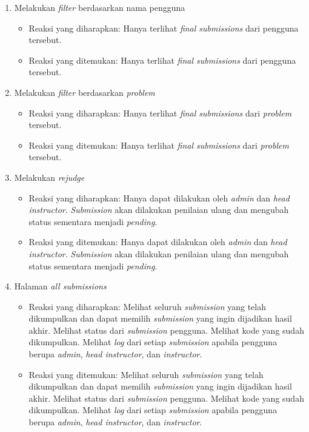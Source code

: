 \begin{enumerate}
\begin{itemize}
	 \end{itemize}
	 \item Melakukan \textit{filter} berdasarkan nama pengguna
	 \begin{itemize}
	 	\item Reaksi yang diharapkan: Hanya terlihat \textit{final submissions} dari pengguna tersebut.
	 	\item Reaksi yang ditemukan: Hanya terlihat \textit{final submissions} dari pengguna tersebut.
	 \end{itemize}
	 \item Melakukan \textit{filter} berdasarkan \textit{problem}
	 \begin{itemize}
	 	\item Reaksi yang diharapkan: Hanya terlihat \textit{final submissions} dari \textit{problem} tersebut.
	 	\item Reaksi yang ditemukan: Hanya terlihat \textit{final submissions} dari \textit{problem} tersebut.
	 \end{itemize}
	 \item Melakukan \textit{rejudge}
	 \begin{itemize}
	 	\item Reaksi yang diharapkan: Hanya dapat dilakukan oleh \textit{admin} dan \textit{head instructor}. \textit{Submission} akan dilakukan penilaian ulang dan mengubah status sementara menjadi \textit{pending}.
	 	\item Reaksi yang ditemukan: Hanya dapat dilakukan oleh \textit{admin} dan \textit{head instructor}. \textit{Submission} akan dilakukan penilaian ulang dan mengubah status sementara menjadi \textit{pending}.
	 \end{itemize}
	 \item Halaman \textit{all submissions}
	 \begin{itemize}
	 	\item Reaksi yang diharapkan: Melihat seluruh \textit{submission} yang telah dikumpulkan dan dapat memilih \textit{submission} yang ingin dijadikan hasil akhir. Melihat status dari \textit{submission} pengguna. Melihat kode yang sudah dikumpulkan. Melihat \textit{log} dari setiap \textit{submission} apabila pengguna berupa \textit{admin}, \textit{head instructor}, dan \textit{instructor}.
	 	\item Reaksi yang ditemukan: Melihat seluruh \textit{submission} yang telah dikumpulkan dan dapat memilih \textit{submission} yang ingin dijadikan hasil akhir. Melihat status dari \textit{submission} pengguna. Melihat kode yang sudah dikumpulkan. Melihat \textit{log} dari setiap \textit{submission} apabila pengguna berupa \textit{admin}, \textit{head instructor}, dan \textit{instructor}.

\end{itemize}
\end{enumerate}

